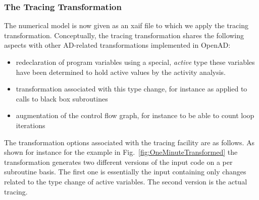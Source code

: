 \documentclass{article}
\newcommand{\reffig}[1]{{Fig.~\ref{#1}}}
\begin{document}
\subsubsection{The Tracing Transformation}
The numerical model is now given as an xaif file to which we apply the tracing transformation. 
Conceptually, the tracing transformation shares the following aspects with other 
AD-related transformations implemented in 
OpenAD:
\begin{itemize}
\item redeclaration of program variables using a special, {\em active} type these variables 
	have been determined to hold active values by the activity analysis.
\item transformation associated with this type change, for instance as  applied to 
	calls to black box subroutines
\item augmentation of the control flow graph, for instance to be able to count loop iterations
\end{itemize}
The transformation options associated with the tracing facility are as follows.
{\scriptsize
{}
}
As shown for instance for the example in \reffig{fig:OneMinuteTransformed} the 
transformation generates two different versions of the input code on a per subroutine basis. 
The first one is essentially the input containing only changes related to the 
type change of active variables. The second version is the actual tracing. 
\end{document}
